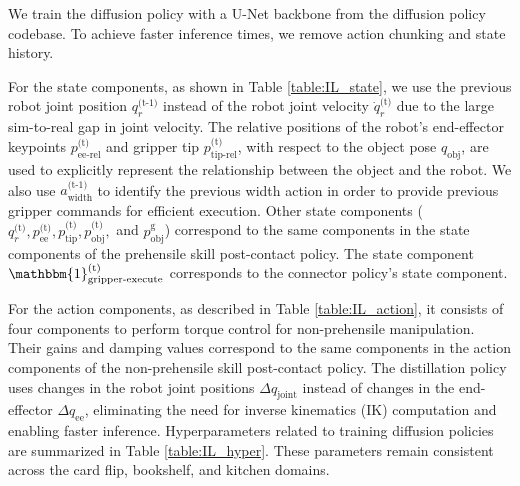 
% 


We train the diffusion policy with a U-Net backbone from the diffusion policy \cite{chi2023diffusion} codebase. To achieve faster inference times, we remove action chunking and state history.

For the state components, as shown in Table \ref{table:IL_state}, we use the previous robot joint position \( q^\text{(t-1)}_r \) instead of the robot joint velocity $\dot{q}^\text{(t)}_r$ due to the large sim-to-real gap in joint velocity. The relative positions of the robot's end-effector keypoints $p^\text{(t)}_\text{ee-rel}$ and gripper tip $p^\text{(t)}_\text{tip-rel}$, with respect to the object pose $q_\text{obj}$, are used to explicitly represent the relationship between the object and the robot. We also use \( a^\text{(t-1)}_\text{width} \) to identify the previous width action in order to provide previous gripper commands for efficient execution. Other state components (\( q^\text{(t)}_r, p^\text{(t)}_\text{ee}, p^\text{(t)}_\text{tip}, p^\text{(t)}_\text{obj}, \) and \( p^\text{g}_\text{obj} \)) correspond to the same components in the state components of the prehensile skill post-contact policy. The state component \( \mathbbm{1}^\text{(t)}_\text{gripper-execute} \) corresponds to the connector policy's state component.


For the action components, as described in Table \ref{table:IL_action}, it consists of four components to perform torque control for non-prehensile manipulation. Their gains and damping values correspond to the same components in the action components of the non-prehensile skill post-contact policy. The distillation policy uses changes in the robot joint positions $\Delta q_\text{joint}$ instead of changes in the end-effector $\Delta q_\text{ee}$, eliminating the need for inverse kinematics (IK) computation and enabling faster inference. Hyperparameters related to training diffusion policies are summarized in Table \ref{table:IL_hyper}. These parameters remain consistent across the card flip, bookshelf, and kitchen domains.